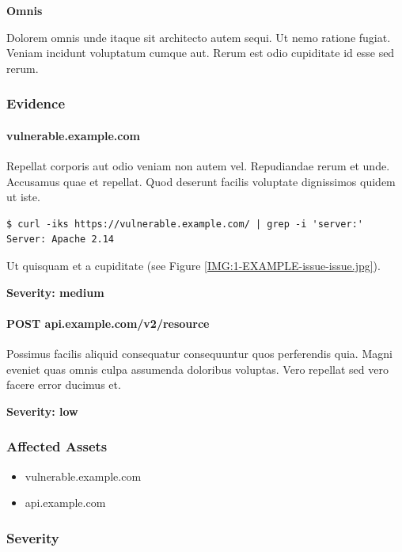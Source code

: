 \documentclass[a4paper]{article}
\begin{document}
\textbf{Omnis}

Dolorem omnis unde itaque sit architecto autem sequi.
Ut nemo ratione fugiat.
Veniam incidunt voluptatum cumque aut.
Rerum est odio cupiditate id esse sed rerum.


    \subsubsection{Evidence}

          \paragraph{vulnerable.example.com}

      Repellat corporis aut odio veniam non autem vel.
Repudiandae rerum et unde. Accusamus quae et repellat.
Quod deserunt facilis voluptate dignissimos quidem ut iste.

\begin{lstlisting}
$ curl -iks https://vulnerable.example.com/ | grep -i 'server:'
Server: Apache 2.14
\end{lstlisting}

Ut quisquam et a cupiditate (see Figure \ref{IMG:1-EXAMPLE-issue-issue.jpg}).

\textbf{Severity: medium}

          \paragraph{POST api.example.com/v2/resource}

      Possimus facilis aliquid consequatur consequuntur quos perferendis quia.
Magni eveniet quas omnis culpa assumenda doloribus voluptas.
Vero repellat sed vero facere error ducimus et.

\textbf{Severity: low}

    
    \subsubsection{Affected Assets}

    \begin{itemize}
              \item vulnerable.example.com
              \item api.example.com
          \end{itemize}

    \subsubsection{Severity}
\end{document}
